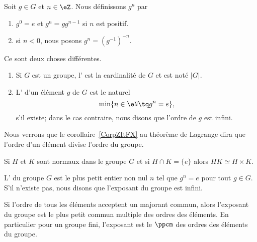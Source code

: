 \begin{definition}
    Soit \( g\in G\) et \( n\in \eZ\). Nous définissons \( g^n\) par
    \begin{enumerate}
        \item
            \( g^0=e\) et \( g^n=gg^{n-1}\) si \( n\) est positif.
        \item
            si \( n<0\), nous posons \( g^n=(g^{-1})^{-n}\).
    \end{enumerate}
\end{definition}

\begin{definition}
    Ce sont deux choses différentes.
    \begin{enumerate}
        \item

    Si \( G\) est un groupe, l' est la cardinalité de \( G\) et est noté \( | G |\).
\item

    L' d'un élément \( g\) de \( G\) est le naturel
    \begin{equation}
        \min\{ n\in\eN\tq g^n=e \},
    \end{equation}
    s'il existe; dans le cas contraire, nous disons que l'ordre de \( g\) est infini.
    \end{enumerate}
\end{definition}
Nous verrons que le corollaire~\ref{CorpZItFX} au théorème de Lagrange dira que l'ordre d'un élément divise l'ordre du groupe.

\begin{lemma}\label{LemHUkMxp}
    Si \( H\) et \( K\) sont normaux dans le groupe \( G\) et si \( H\cap K=\{ e \}\) alors \( HK\simeq H\times K\).
\end{lemma}

\begin{definition}  \label{DefvtSAyb}
    L' du groupe \( G\) est le plus petit entier non nul \( n\) tel que \( g^n=e\) pour tout \( g\in G\). S'il n'existe pas, nous disons que l'exposant du groupe est infini.
\end{definition}
Si l'ordre de tous les éléments acceptent un majorant commun, alors l'exposant du groupe est le plus petit commun multiple des ordres des éléments. En particulier pour un groupe fini, l'exposant est le $\ppcm$ des ordres des éléments du groupe.

